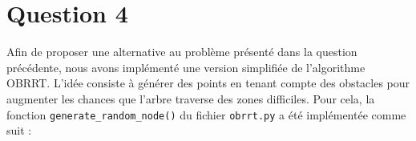 \documentclass[../CSC_5RO16_TA_TP2.tex]{subfiles}
\begin{document}
\section{Question 4}
\noindent Afin de proposer une alternative au problème présenté dans la question précédente, nous avons implémenté une version simplifiée de l'algorithme \textcolor{graph_green}{OBRRT}. L'idée consiste à générer des points en tenant compte des obstacles pour augmenter les chances que l'arbre traverse des zones difficiles. Pour cela, la fonction \texttt{generate\_random\_node()} du fichier \texttt{obrrt.py} a été implémentée comme suit :
\end{document}

